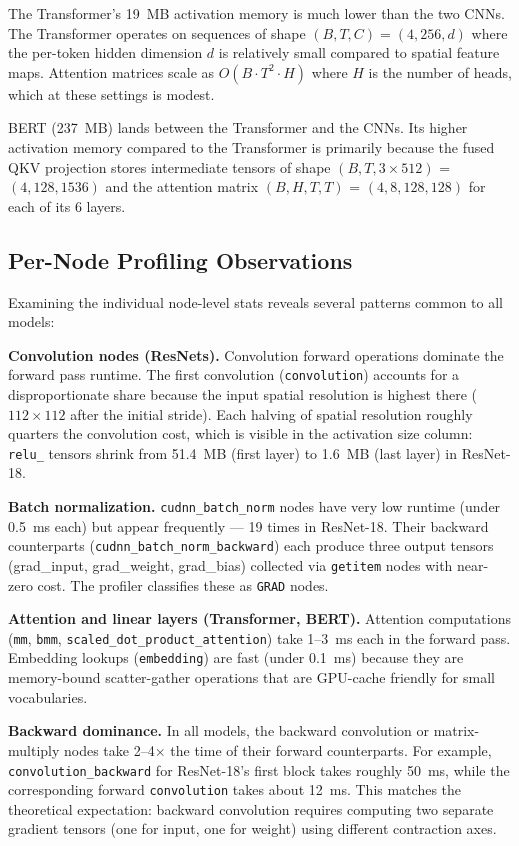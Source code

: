 \documentclass[11pt]{article}
\begin{document}
The Transformer's 19~MB activation memory is much lower than the two CNNs.
The Transformer operates on sequences of shape $(B, T, C) = (4, 256, d)$
where the per-token hidden dimension $d$ is relatively small compared to
spatial feature maps. Attention matrices scale as $O(B \cdot T^2 \cdot H)$
where $H$ is the number of heads, which at these settings is modest.

BERT (237~MB) lands between the Transformer and the CNNs. Its higher
activation memory compared to the Transformer is primarily because the
fused QKV projection stores intermediate tensors of shape
$(B, T, 3 \times 512)$ = $(4, 128, 1536)$ and the attention matrix
$(B, H, T, T)$ = $(4, 8, 128, 128)$ for each of its 6 layers.

\subsection{Per-Node Profiling Observations}

Examining the individual node-level stats reveals several patterns common
to all models:

\textbf{Convolution nodes (ResNets).} Convolution forward operations
dominate the forward pass runtime. The first convolution
(\texttt{convolution}) accounts for a disproportionate share because the
input spatial resolution is highest there ($112\times112$ after the initial
stride). Each halving of spatial resolution roughly quarters the convolution
cost, which is visible in the activation size column: \texttt{relu\_}
tensors shrink from 51.4~MB (first layer) to 1.6~MB (last layer) in
ResNet-18.

\textbf{Batch normalization.} \texttt{cudnn\_batch\_norm} nodes have very
low runtime (under 0.5~ms each) but appear frequently --- 19 times in
ResNet-18. Their backward counterparts (\texttt{cudnn\_batch\_norm\_backward})
each produce three output tensors (grad\_input, grad\_weight, grad\_bias)
collected via \texttt{getitem} nodes with near-zero cost. The profiler
classifies these as \texttt{GRAD} nodes.

\textbf{Attention and linear layers (Transformer, BERT).} Attention
computations (\texttt{mm}, \texttt{bmm}, \texttt{scaled\_dot\_product\_attention})
take 1--3~ms each in the forward pass. Embedding lookups (\texttt{embedding})
are fast (under 0.1~ms) because they are memory-bound scatter-gather
operations that are GPU-cache friendly for small vocabularies.

\textbf{Backward dominance.} In all models, the backward convolution or
matrix-multiply nodes take 2--4$\times$ the time of their forward
counterparts. For example, \texttt{convolution\_backward} for ResNet-18's
first block takes roughly 50~ms, while the corresponding forward
\texttt{convolution} takes about 12~ms. This matches the theoretical
expectation: backward convolution requires computing two separate gradient
tensors (one for input, one for weight) using different contraction axes.
\end{document}
